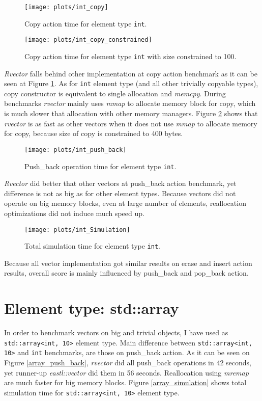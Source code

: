 \documentclass[inz, english, shortabstract]{iithesis}
\begin{document}
\begin{figure}[h!]
\texttt{[image: plots/int\_copy]}
\caption{Copy action time for element type \lstinline{int}.}
\label{int_copy}
\end{figure}

\begin{figure}[h!]
\texttt{[image: plots/int\_copy\_constrained]}
\caption{Copy action time for element type \lstinline{int} with size constrained to 100.}
\label{int_copy_constrained}
\end{figure}

{\it Rvector} falls behind other implementation at copy action benchmark as it can be seen at Figure \ref{int_copy}. As for \lstinline{int} element type (and all other trivially copyable types), copy constructor is equivalent to single allocation and {\it memcpy}. During benchmarks {\it rvector} mainly uses {\it mmap} to allocate memory block for copy, which is much slower that allocation with other memory managers. Figure \ref{int_copy_constrained} shows that {\it rvector} is as fast as other vectors when it does not use {\it mmap} to allocate memory for copy, because size of copy is constrained to 400 bytes.

\begin{figure}[h!]
\texttt{[image: plots/int\_push\_back]}
\caption{Push\_back operation time for element type \lstinline{int}.}
\label{int_push_back}
\end{figure}

{\it Rvector} did better that other vectors at push\_back action benchmark, yet difference is not as big as for other element types. Because vectors did not operate on big memory blocks, even at large number of elements, reallocation optimizations did not induce much speed up.

\begin{figure}[h!]
\texttt{[image: plots/int\_Simulation]}
\caption{Total simulation time for element type \lstinline{int}.}
\label{int_simulation}
\end{figure}

Because all vector implementation got similar results on erase and insert action results, overall score is mainly influenced by push\_back and pop\_back action.

\section{Element type: std::array}
In order to benchmark vectors on big and trivial objects, I have used as \lstinline{std::array<int, 10>} element type. Main difference between \lstinline{std::array<int, 10>} and \lstinline{int} benchmarks, are those on push\_back action. As it can be seen on Figure \ref{array_push_back}, {\it rvector} did all push\_back operations in 42 seconds, yet runner-up {\it eastl::vector} did them in 56 seconds. Reallocation using {\it mremap} are much faster for big memory blocks. Figure \ref{array_simulation} shows total simulation time for \lstinline{std::array<int, 10>} element type.
\end{document}

